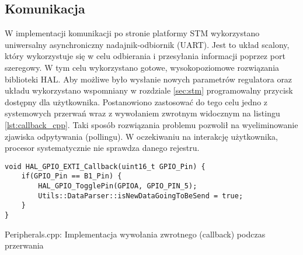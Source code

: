 \subsection{Komunikacja} \label{sec:uart}
W implementacji komunikacji po stronie platformy STM wykorzystano uniwersalny asynchroniczny
nadajnik-odbiornik (UART). Jest to układ scalony, który wykorzystuje się w celu odbierania i przesyłania
informacji poprzez port szeregowy. W tym celu wykorzystano gotowe, wysokopoziomowe rozwiązania
biblioteki HAL. Aby możliwe było wysłanie nowych parametrów regulatora oraz układu wykorzystano wspomniany
w rozdziale \ref{sec:stm} programowalny przycisk dostępny dla użytkownika. Postanowiono zastosować do tego
celu jedno z systemowych przerwań wraz z wywołaniem zwrotnym widocznym na listingu \ref{lst:callback_cpp}.
Taki sposób rozwiązania problemu pozwolił na wyeliminowanie zjawiska odpytywania (pollingu). W oczekiwaniu
na interakcję użytkownika, procesor systematycznie nie sprawdza danego rejestru.
\begin{listing}[htb]
\begin{verbatim}
void HAL_GPIO_EXTI_Callback(uint16_t GPIO_Pin) {
    if(GPIO_Pin == B1_Pin) {
        HAL_GPIO_TogglePin(GPIOA, GPIO_PIN_5);
        Utils::DataParser::isNewDataGoingToBeSend = true;
    }
}
\end{verbatim}
\caption{Peripherals.cpp: Implementacja wywołania zwrotnego (callback) podczas przerwania}
\label{lst:callback_cpp}
\end{listing}

